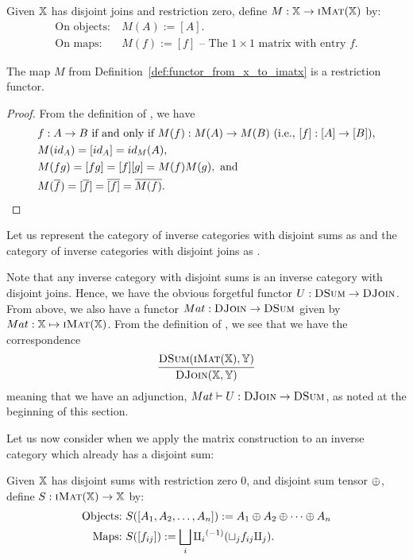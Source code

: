 \begin{definition}\label{def:functor_from_x_to_imatx}
  Given $\mathbb{X}$ has disjoint joins and restriction zero, define $M:\mathbb{X} \to \textsc{iMat}({\mathbb{X}})$ by:
  \begin{align*}
    \text{On objects:}\ &M(A) := [A].\\
    \text{On maps:}\ &M(f) := [f] \text{ -- The }1\times1\text{ matrix with entry }f.
  \end{align*}
\end{definition}
\begin{lemma}\label{lem:m_is_a_functor}
  The map $M$ from Definition~\ref{def:functor_from_x_to_imatx} is a restriction functor.
\end{lemma}
\begin{proof}
  From the definition of \imatx, we have
  \begin{align*}
    &f: A\to B \text{ if and only if } M(f):M(A)\to M(B)\  (\text{i.e., }[f]: [A]\to [B]),\\
    &M(id_A)  = [id_{A}] = id_M(A),\\
    &M(f g) = [f g] = [f][g] = M(f) M(g),\text{ and}\\
    &M(\overline{f}) = [\overline{f}] = \overline{[f]} = \overline{M(f)}.
  \end{align*}
\end{proof}

Let us represent the category of inverse categories with disjoint sums as \DSum and the
category of inverse categories with disjoint joins as \DJoin.

Note that any inverse category with disjoint sums is an inverse category with disjoint joins. Hence,
we have the obvious forgetful functor $U:\textsc{DSum} \to \textsc{DJoin}$. From above, we also have a functor
$Mat:\textsc{DJoin} \to \textsc{DSum}$ given by $Mat: \mathbb{X} \mapsto \textsc{iMat}({\mathbb{X}})$. From the definition of \imatx, we see
that we have the correspondence
\[
  \infer{\DJoin(\X,\Y)}{\DSum(\imatx,\Y)}
\]
meaning that we have an adjunction, $Mat\vdash U:\textsc{DJoin} \to \textsc{DSum}$, as noted at the beginning
of this section.

Let us now consider when we apply the matrix construction to an inverse category which already has a
disjoint sum:

\begin{definition}\label{def:functor_from_imatx_to_x}
  Given $\mathbb{X}$ has disjoint sums with restriction zero $0$,
  and disjoint sum tensor $\oplus$, define $S:\textsc{iMat}({\mathbb{X}}) \to \mathbb{X}$ by:
  \begin{align*}
    \text{Objects:}\ &S([A_1,A_2, \ldots, A_n]) := A_1\oplus A_2\oplus\cdots\oplus A_n\\
    \text{Maps:}\ &S([f_{ij}]) := \bigsqcup_i {\amalg_{i}}^{(-1)} (\sqcup_j f_{ij} \amalg_{j}).
  \end{align*}
\end{definition}

